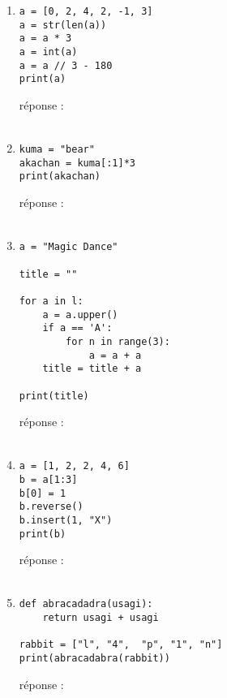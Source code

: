 \documentclass[12pt,a4paper]{article}
\newcommand{\response}{réponse : \hrulefill\\\\}
\begin{document}
\begin{enumerate}
\begin{lstlisting}
def is_p(a):
	if n // 2 == n / 2:
		return True
	return False

l = [1, 5, 8, 3, 10]
p = []
i = []

while len(l) > 0:
	n = l.pop(0)
	if is_p(n):
		p.append(n)
	else:
		i.append(n)
		
print(str(p) + " " str(i))
\end{lstlisting}
\response %


\item
\begin{lstlisting}
a = [0, 2, 4, 2, -1, 3]
a = str(len(a))
a = a * 3
a = int(a)
a = a // 3 - 180
print(a) 
\end{lstlisting}
\response %

\item
\begin{lstlisting}
kuma = "bear"
akachan = kuma[:1]*3
print(akachan)

\end{lstlisting}
\response %

\pagebreak
\item
\begin{lstlisting}
a = "Magic Dance"

title = ""

for a in l:
	a = a.upper()
	if a == 'A':
		for n in range(3):
			a = a + a
	title = title + a
	
print(title)
\end{lstlisting}
\response %

\item
\begin{lstlisting}
a = [1, 2, 2, 4, 6]
b = a[1:3]
b[0] = 1
b.reverse()
b.insert(1, "X")
print(b) 
\end{lstlisting}
\response %

\item
\begin{lstlisting}
def abracadadra(usagi):
	return usagi + usagi

rabbit = ["l", "4",  "p", "1", "n"]
print(abracadabra(rabbit))
\end{lstlisting}
\response %

\end{enumerate}
\end{document}
